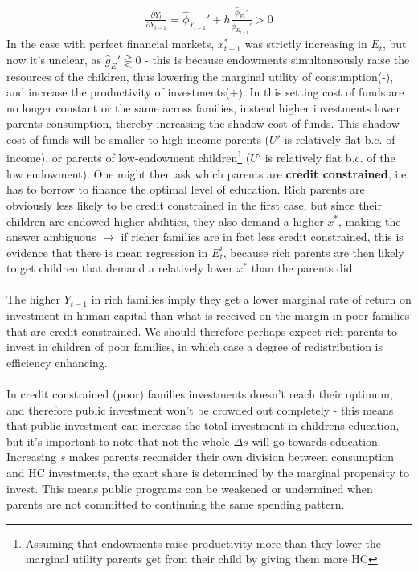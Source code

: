\documentclass[12pt, a4paper]{article}
\begin{document}
\begin{multicols}{2}
\begin{align*}
\frac{\partial Y_t}{\partial Y_{t-1}} = \hat{\phi}_{Y_{t-1}}' + h \frac{\hat{\phi}_{E_{t}}'}{\hat{\phi}_{E_{t-1}}'}>0
\end{align*}
In the case with perfect financial markets, $x_{t-1}^*$ was strictly increasing in $E_t$, but now it's unclear, as $\hat{g}_{E}'\gtreqless 0$ - this is because endowments simultaneously raise the resources of the children, thus lowering the marginal utility of consumption(-), and increase the productivity of investments(+). In this setting cost of funds are no longer constant or the same across families, instead higher investments lower parents consumption, thereby increasing the shadow cost of funds. This shadow cost of funds will be smaller to high income parents ($U'$ is relatively flat b.c. of income), or parents of low-endowment children\footnote{Assuming that endowments raise productivity more than they lower the marginal utility parents get from their child by giving them more HC} ($U'$ is relatively flat b.c. of the low endowment). One might then ask which parents are \textbf{credit constrained}, i.e. has to borrow to finance the optimal level of education. Rich parents are obviously less likely to be credit constrained in the first case, but since their children are endowed higher abilities, they also demand a higher $x^*$, making the answer ambiguous $\rightarrow$ if richer families are in fact less credit constrained, this is evidence that there is mean regression in $E_t^i$, because rich parents are then likely to get children that demand a relatively lower $x^*$ than the parents did. 
\\ \\
The higher $Y_{t-1}$ in rich families imply they get a lower marginal rate of return on investment in human capital than what is received on the margin in poor families that are credit constrained. We should therefore perhaps expect rich parents to invest in children of poor families, in which case a degree of redistribution is efficiency enhancing. 
\\ \\
In credit constrained (poor) families investments doesn't reach their optimum, and therefore public investment won't be crowded out completely - this means that public investment can increase the total investment in childrens education, but it's important to note that not the whole $\Delta s$ will go towards education. Increasing $s$ makes parents reconsider their own division between consumption and HC investments, the exact share is determined by the marginal propensity to invest. This means public programs can be weakened or undermined when parents are not committed to continuing the same spending pattern.


\end{multicols}
\end{document}
